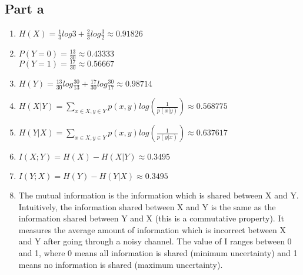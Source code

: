 \documentclass{article}
\begin{document}
\subsection{Part a}
\begin{enumerate}[label=\roman*. ]
\item \(H(X)=\frac{1}{3}log 3 + \frac{2}{3}log\frac{3}{2} \approx 0.91826\)
\item \(P(Y=0)=\frac{13}{30} \approx 0.43333\)\\\(P(Y=1)=\frac{17}{30} \approx 0.56667\)
\item \(H(Y)=\frac{13}{30}log\frac{30}{13} + \frac{17}{30}log\frac{30}{17} \approx 0.98714\)
\item \(H(X|Y)=\displaystyle\sum_{x\in X,y\in Y} p(x,y)log(\frac{1}{p(x|y)}) \approx 0.568775\)
\item \(H(Y|X)=\displaystyle\sum_{x\in X,y\in Y} p(x,y)log(\frac{1}{p(y|x)}) \approx 0.637617\)
\item \(I(X;Y)=H(X)-H(X|Y) \approx 0.3495\)
\item \(I(Y;X)=H(Y)-H(Y|X) \approx 0.3495\)
\item The mutual information is the information which is shared between X and Y.  Intuitively, the information shared between X and Y is the same as the information shared between Y and X (this is a commutative property).  It measures the average amount of information which is incorrect between X and Y after going through a noisy channel.  The value of I ranges between 0 and 1, where 0 means all information is shared (minimum uncertainty) and 1 means no information is shared (maximum uncertainty).
\end{enumerate}
\end{document}
